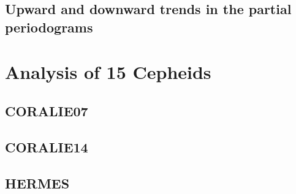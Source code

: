     \section{Upward and downward trends in the partial periodograms}
\chapter{Analysis of 15 Cepheids}
\label{resultsb}
    \section{CORALIE07}
    \section{CORALIE14}
    \section{HERMES}



